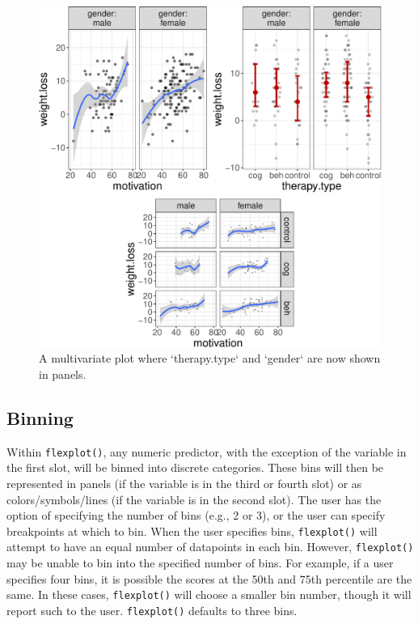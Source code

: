 \documentclass[
  doc]{apa6}
\begin{document}
\begin{figure}

{\centering \includegraphics[width=1\linewidth]{flexplot_psychmeth_files/figure-latex/panels-1} 

}

\caption{A multivariate plot where `therapy.type` and `gender` are now shown in panels. \label{fig:panels}}\label{fig:panels}
\end{figure}

\hypertarget{binning}{%
\subsection{Binning}\label{binning}}

Within \texttt{flexplot()}, any numeric predictor, with the exception of the variable in the first slot, will be binned into discrete categories. These bins will then be represented in panels (if the variable is in the third or fourth slot) or as colors/symbols/lines (if the variable is in the second slot). The user has the option of specifying the number of bins (e.g., 2 or 3), or the user can specify breakpoints at which to bin. When the user specifies bins, \texttt{flexplot()} will attempt to have an equal number of datapoints in each bin. However, \texttt{flexplot()} may be unable to bin into the specified number of bins. For example, if a user specifies four bins, it is possible the scores at the 50th and 75th percentile are the same. In these cases, \texttt{flexplot()} will choose a smaller bin number, though it will report such to the user. \texttt{flexplot()} defaults to three bins.
\end{document}
